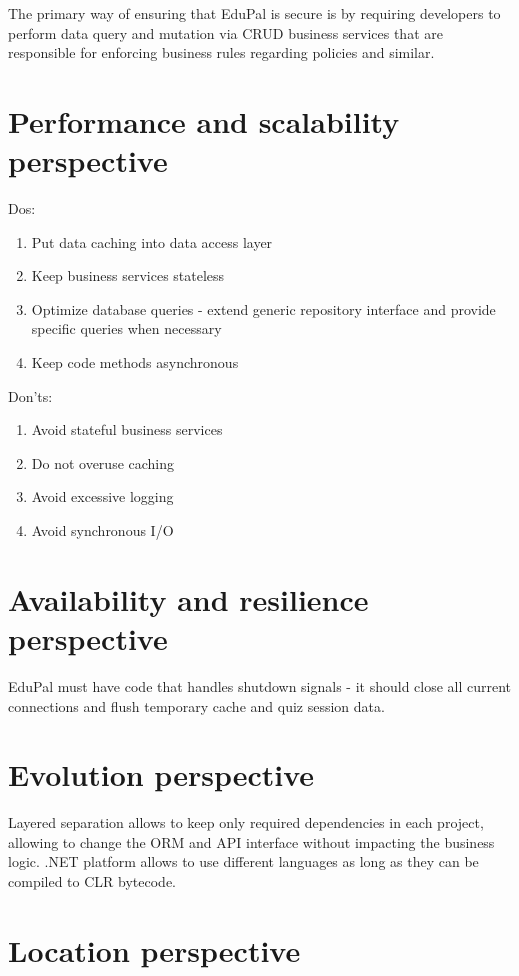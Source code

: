 The primary way of ensuring that EduPal is secure is by requiring developers to perform data query and mutation via CRUD business services that are responsible for enforcing business rules regarding policies and similar.

\section{Performance and scalability perspective}

Dos:

\begin{enumerate}
  \item Put data caching into data access layer
  \item Keep business services stateless
  \item Optimize database queries - extend generic repository interface and provide specific queries when necessary
  \item Keep code methods asynchronous
\end{enumerate}

Don'ts:

\begin{enumerate}
  \item Avoid stateful business services
  \item Do not overuse caching
  \item Avoid excessive logging
  \item Avoid synchronous I/O
\end{enumerate}

\section{Availability and resilience perspective}

EduPal must have code that handles shutdown signals - it should close all current connections and flush temporary cache and quiz session data.

\section{Evolution perspective}

Layered separation allows to keep only required dependencies in each project, allowing to change the ORM and API interface without impacting the business logic. .NET platform allows to use different languages as long as they can be compiled to CLR bytecode.

\section{Location perspective}

